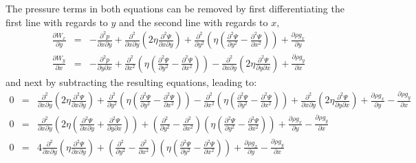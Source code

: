 The pressure terms in both equations can be removed by first differentiating
the first line with regards to $y$ and the second line with regards to $x$, 
\begin{eqnarray}
\frac{\partial W_x}{\partial y}&=&-\frac{\partial^2 p}{\partial x \partial y} 
+ \frac{\partial^2 }{\partial x \partial y} \left(2\eta \frac{\partial^2 \Psi}{\partial x \partial y} \right)
+ \frac{\partial^2 }{\partial y^2} \left( \eta (\frac{\partial^2 \Psi}{\partial y^2}-\frac{\partial^2 \Psi}{\partial x^2}) \right)
+ \frac{\partial \rho g_x}{\partial y}
\\
\frac{\partial W_y}{\partial x}&=&-\frac{\partial^2 p}{\partial y \partial x} 
+ \frac{\partial^2 }{\partial x^2} \left( \eta (\frac{\partial^2 \Psi}{\partial y^2}-\frac{\partial^2 \Psi}{\partial x^2}) \right) 
- \frac{\partial^2 }{\partial x\partial y} \left(2\eta \frac{\partial^2 \Psi}{\partial y \partial x} \right)
+ \frac{\partial \rho g_y}{\partial x}
\end{eqnarray}
and next by subtracting the resulting equations, leading to:
{\small
\begin{eqnarray}
0 &=& 
\frac{\partial^2 }{\partial x \partial y} \left(2\eta \frac{\partial^2 \Psi}{\partial x \partial y} \right)
+ \frac{\partial^2 }{\partial y^2} \left( \eta (\frac{\partial^2 \Psi}{\partial y^2}-\frac{\partial^2 \Psi}{\partial x^2}) \right)
- \frac{\partial^2 }{\partial x^2} \left( \eta (\frac{\partial^2 \Psi}{\partial y^2}-\frac{\partial^2 \Psi}{\partial x^2}) \right) 
+ \frac{\partial^2 }{\partial x\partial y} \left(2\eta \frac{\partial^2 \Psi}{\partial y \partial x} \right)
+ \frac{\partial \rho g_x}{\partial y}
- \frac{\partial \rho g_y}{\partial x}
\nonumber\\
0 &=& 
\frac{\partial^2 }{\partial x \partial y} 
\left(2\eta (\frac{\partial^2 \Psi}{\partial x \partial y} 
+  \frac{\partial^2 \Psi}{\partial y \partial x} )
\right)
+ 
\left( 
\frac{\partial^2 }{\partial y^2}
- \frac{\partial^2 }{\partial x^2}
\right)
\left( \eta (\frac{\partial^2 \Psi}{\partial y^2}-\frac{\partial^2 \Psi}{\partial x^2}) \right)
+ \frac{\partial \rho g_x}{\partial y}
- \frac{\partial \rho g_y}{\partial x}
\nonumber\\
0 &=& 
4\frac{\partial^2 }{\partial x \partial y} 
\left(\eta \frac{\partial^2 \Psi}{\partial x \partial y} 
\right)
+ 
\left( 
\frac{\partial^2 }{\partial y^2}
- \frac{\partial^2 }{\partial x^2}
\right)
\left( \eta (\frac{\partial^2 \Psi}{\partial y^2}-\frac{\partial^2 \Psi}{\partial x^2}) \right)
+ \frac{\partial \rho g_x}{\partial y}
- \frac{\partial \rho g_y}{\partial x}
\end{eqnarray}
}
